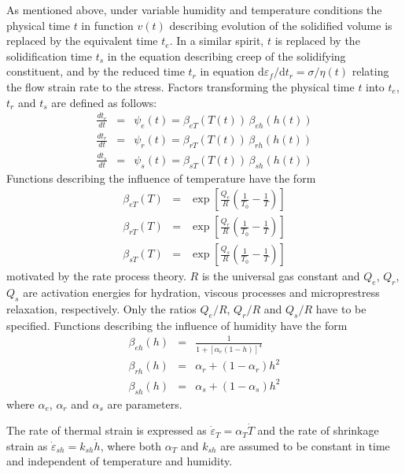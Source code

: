\documentclass[a4paper]{article}
\begin{document}
As mentioned above, under variable humidity and temperature conditions the physical time $t$ in function $v(t)$ describing evolution of the solidified volume is replaced by the equivalent time $t_e$. In a similar spirit, $t$ is replaced by the solidification time $t_s$ in the equation describing creep of the solidifying constituent, and by the reduced time $t_r$ in equation $\mbox{d} \varepsilon_f / \mbox{d} t_r = \sigma / \eta(t)$ relating the flow strain rate to the stress.
Factors transforming the physical time $t$ into $t_e$, $t_r$ and $t_s$ are defined as follows:
\begin{eqnarray}
\label{dtedt}
 \frac{dt_e}{dt} &=& \psi_e(t) = \beta_{eT}(T(t))\, \beta_{eh}(h(t))\\
 \frac{dt_r}{dt} &=& \psi_r(t) = \beta_{rT}(T(t))\, \beta_{rh}(h(t))\\
 \frac{dt_s}{dt} &=& \psi_s(t) = \beta_{sT}(T(t))\, \beta_{sh}(h(t))
\end{eqnarray}
Functions describing the influence of temperature have the form 
\begin{eqnarray}
 \beta_{eT}(T) &=& \exp \left[ \frac{Q_e}{R}\left( \frac{1}{T_0} - \frac{1}{T} \right) \right]\\
 \beta_{rT}(T) &=& \exp \left[ \frac{Q_r}{R}\left( \frac{1}{T_0} - \frac{1}{T} \right) \right]\\
 \beta_{sT}(T) &=& \exp \left[ \frac{Q_s}{R}\left( \frac{1}{T_0} - \frac{1}{T} \right) \right]
\end{eqnarray}
motivated by the rate process theory.
$R$ is the universal gas constant and $Q_e$, $Q_r$, $Q_s$ are activation energies for hydration, viscous processes and microprestress relaxation, respectively.
Only the ratios $Q_e/R$, $Q_r/R$ and $Q_s/R$ have to be specified.
Functions describing the influence of humidity have the form 
\begin{eqnarray}
 \beta_{eh}(h) &=& \frac{1}{1+\left[\alpha_e \left( 1-h\right) \right]^4}\\
 \beta_{rh}(h) &=& \alpha_r + \left( 1 - \alpha_r \right) h^2\\
 \beta_{sh}(h) &=& \alpha_s + \left( 1 - \alpha_s \right) h^2
\end{eqnarray}
where $\alpha_e$, $\alpha_r$ and $\alpha_s$ are parameters. 

The rate of thermal strain is expressed as $\dot{\varepsilon}_T = \alpha_T \dot{T}$ and the rate of shrinkage strain as $\dot{\varepsilon}_{sh} = k_{sh} \dot{h}$, where both $\alpha_T$ and $k_{sh}$ are assumed to be constant in time and independent of temperature and humidity. 
\end{document}
